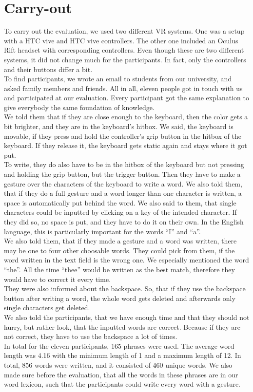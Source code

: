 \section{Carry-out}
To carry out the evaluation, we used two different VR systems. One was a setup with a HTC vive and HTC vive controllers. The other one included an Oculus Rift headset with corresponding controllers. Even though these are two different systems, it did not change much for the participants. In fact, only the controllers and their buttons differ a bit.\\
To find participants, we wrote an email to students from our university, and asked family members and friends. All in all, eleven people got in touch with us and participated at our evaluation. Every participant got the same explanation to give everybody the same foundation of knowledge.\\
We told them that if they are close enough to the keyboard, then the color gets a bit brighter, and they are in the keyboard's hitbox. We said, the keyboard is movable, if they press and hold the controller's grip button in the hitbox of the keyboard. If they release it, the keyboard gets static again and stays where it got put.\\
To write, they do also have to be in the hitbox of the keyboard but not pressing and holding the grip button, but the trigger button. Then they have to make a gesture over the characters of the keyboard to write a word. We also told them, that if they do a full gesture and a word longer than one character is written, a space is automatically put behind the word. We also said to them, that single characters could be inputted by clicking on a key of the intended character. If they did so, no space is put, and they have to do it on their own. In the English language, this is particularly important for the words ``I'' and ``a''.\\
We also told them, that if they made a gesture and a word was written, there may be one to four other choosable words. They could pick from them, if the word written in the text field is the wrong one. We especially mentioned the word ``the''. All the time ``thee'' would be written as the best match, therefore they would have to correct it every time.\\
They were also informed about the backspace. So, that if they use the backspace button after writing a word, the whole word gets deleted and afterwards only single characters get deleted.\\
We also told the participants, that we have enough time and that they should not hurry, but rather look, that the inputted words are correct. Because if they are not correct, they have to use the backspace a lot of times.\\
In total for the eleven participants, 165 phrases were used. The average word length was 4.16 with the minimum length of 1 and a maximum length of 12. In total, 856 words were written, and it consisted of 460 unique words. We also made sure before the evaluation, that all the words in these phrases are in our word lexicon, such that the participants could write every word with a gesture.
